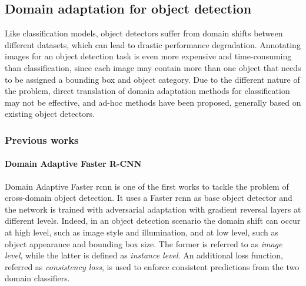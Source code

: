 \documentclass[%
    corpo=12pt,
    twoside,
    stile=classica,   
    tipotesi=magistrale,
    evenboxes,
    english,
	numerazioneromana,
]{toptesi}
\begin{document}

\subsection{Domain adaptation for object detection}
Like classification models, object detectors suffer from domain shifts between different datasets, which can lead to drastic performance degradation. Annotating images for an object detection task is even more expensive and time-consuming than classification, since each image may contain more than one object that needs to be assigned a bounding box and object category. Due to the different nature of the problem, direct translation of domain adaptation methods for classification may not be effective, and ad-hoc methods have been proposed, generally based on existing object detectors.

\subsubsection{Previous works}
\paragraph{Domain Adaptive Faster R-CNN}\label{sec:dafrcnn}
Domain Adaptive Faster \gls{rcnn}\cite{chen2018domain} is one of the first works to tackle the problem of cross-domain object detection. It uses a Faster \gls{rcnn} as base object detector and the network is trained with adversarial adaptation with gradient reversal layers at different levels. Indeed, in an object detection scenario the domain shift can occur at high level, such as image style and illumination, and at low level, such as object appearance and bounding box size. The former is referred to as \textit{image level}, while the latter is defined as \textit{instance level}. An additional loss function, referred as \textit{consistency loss}, is used to enforce consistent predictions from the two domain classifiers.
\end{document}

